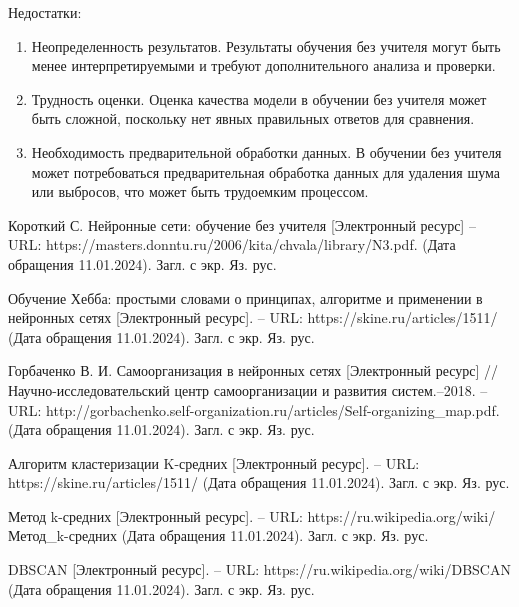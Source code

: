 \documentclass[bachelor, och, referat]{SCWorks}
\begin{document}
Недостатки:
\begin{enumerate}
    \item Неопределенность результатов. Результаты обучения без учителя могут быть менее интерпретируемыми и требуют дополнительного анализа и проверки.
    \item Трудность оценки. Оценка качества модели в обучении без учителя может быть сложной, поскольку нет явных правильных ответов для сравнения.
    \item Необходимость предварительной обработки данных. В обучении без учителя может потребоваться предварительная обработка данных для удаления шума или выбросов, что может быть трудоемким процессом.
\end{enumerate}

\begin{thebibliography}{10}
    Короткий С. Нейронные сети: обучение без учителя [Электронный ресурс] -- URL: https://masters.donntu.ru/2006/kita/chvala/library/N3.pdf. (Дата обращения 11.01.2024). Загл. с экр. Яз. рус.

    Обучение Хебба: простыми словами о принципах, алгоритме и применении в нейронных сетях [Электронный ресурс]. -- URL: https://skine.ru/articles/1511/
    (Дата обращения 11.01.2024). Загл. с экр. Яз. рус.

    Горбаченко В. И. Самоорганизация в нейронных сетях [Электронный ресурс] //Научно-исследовательский центр самоорганизации и развития систем.--2018. -- URL: http://gorbachenko.self-organization.ru/articles/Self-organizing_map.pdf. (Дата обращения 11.01.2024). Загл. с экр. Яз. рус.

    Алгоритм кластеризации K-средних [Электронный ресурс]. -- URL: https://skine.ru/articles/1511/
    (Дата обращения 11.01.2024). Загл. с экр. Яз. рус.

    Метод k-средних [Электронный ресурс]. -- URL: https://ru.wikipedia.org/wiki/Метод_k-средних
    (Дата обращения 11.01.2024). Загл. с экр. Яз. рус.

    DBSCAN [Электронный ресурс]. -- URL: https://ru.wikipedia.org/wiki/DBSCAN
    (Дата обращения 11.01.2024). Загл. с экр. Яз. рус.
\end{thebibliography}
\end{document}
